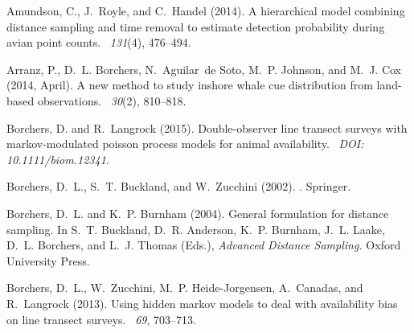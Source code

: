 \documentclass[useAMS,usenatbib,referee]{biom}
\begin{document}

\label{lastpage}


\begin{thebibliography}{}

Amundson, C., J.~Royle, and C.~Handel (2014).
\newblock A hierarchical model combining distance sampling and time removal to
  estimate detection probability during avian point counts.
~{\em 131\/}(4), 476--494.

Arranz, P., D.~L. Borchers, N.~Aguilar~de Soto, M.~P. Johnson, and M.~J. Cox
  (2014, April).
\newblock A new method to study inshore whale cue distribution from land-based
  observations.
~{\em 30\/}(2), 810--818.

Borchers, D. and R.~Langrock (2015).
\newblock Double-observer line transect surveys with markov-modulated poisson
  process models for animal availability.
~{\em DOI: 10.1111/biom.12341}.

Borchers, D.~L., S.~T. Buckland, and W.~Zucchini (2002).
.
\newblock Springer.

Borchers, D.~L. and K.~P. Burnham (2004).
\newblock General formulation for distance sampling.
\newblock In S.~T. Buckland, D.~R. Anderson, K.~P. Burnham, J.~L. Laake, D.~L.
  Borchers, and L.~J. Thomas (Eds.), {\em Advanced Distance Sampling.} Oxford
  University Press.

Borchers, D.~L., W.~Zucchini, M.~P. Heide-Jorgensen, A.~Canadas, and
  R.~Langrock (2013).
\newblock Using hidden markov models to deal with availability bias on line
  transect surveys.
~{\em 69}, 703--713.


\end{thebibliography}
\end{document}
